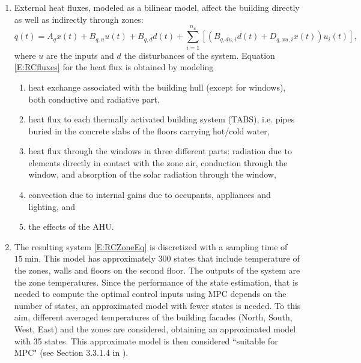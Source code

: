 {\begin{enumerate}
		where $C_a$ and $C_b$ are the heat capacitances of the layers. This is done for each layer of each zone, obtaining the compact representation given in \eqref{E:RCZoneEq}. The thermal parameters are derived from zones geometry and material properties.
	\item External heat fluxes, modeled as a bilinear model, affect the building directly as well as indirectly through zones:
		\begin{equation}\label{E:RCfluxes}
			q(t) = A_q x(t) + B_{q,u}u(t) + B_{q,d}d(t) + \sum_{i=1}^{n_u}{[\left(B_{q,du,i}d(t) + D_{q,xu,i}x(t)\right)u_i(t)]},
		\end{equation}
		where $u$ are the inputs and $d$ the disturbances of the system.
Equation \eqref{E:RCfluxes} for the heat flux is obtained by modeling
	\begin{enumerate}
		\item heat exchange associated with the building hull (except for windows), both conductive and radiative part,
		\item  heat flux to each thermally activated building system (TABS), i.e. pipes buried in the concrete slabs of the floors carrying hot/cold water,
		\item heat flux through the windows in three different parts: radiation due to elements directly in contact with the zone air, conduction through the window, and absorption of the solar radiation through the window,
		\item convection due to internal gains due to occupants, appliances and lighting, and
		\item the effects of the AHU.
	\end{enumerate}
	\item The resulting system \eqref{E:RCZoneEq} is discretized with a sampling time of $15\ \mathrm{min}$.
	This model has approximately 300 states that include temperature of the zones, walls and floors on the second floor.
	The outputs of the system are the zone temperatures.
	Since the performance of the state estimation, that is needed to compute the optimal control inputs using MPC depends on the number of states, an approximated model with fewer states is needed.
	To this aim, different averaged temperatures of the building facades (North, South, West, East) and the zones are considered, obtaining an approximated model with 35 states.
	This  approximate model is then considered ``suitable for MPC" (see Section 3.3.1.4 in \cite{SturzeneggerTR}). 
\end{enumerate}}
	
